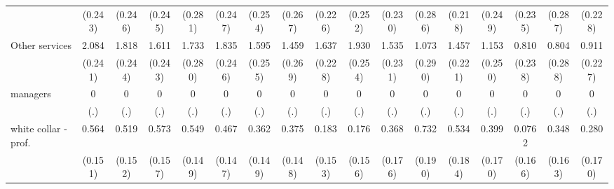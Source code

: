{\begin{tabular}{l*{16}{c}}
                    &     (0.243)         &     (0.246)         &     (0.245)         &     (0.281)         &     (0.247)         &     (0.254)         &     (0.267)         &     (0.226)         &     (0.252)         &     (0.230)         &     (0.286)         &     (0.218)         &     (0.249)         &     (0.235)         &     (0.287)         &     (0.228)         \\
[1em]
Other services      &       2.084\sym{***}&       1.818\sym{***}&       1.611\sym{***}&       1.733\sym{***}&       1.835\sym{***}&       1.595\sym{***}&       1.459\sym{***}&       1.637\sym{***}&       1.930\sym{***}&       1.535\sym{***}&       1.073\sym{***}&       1.457\sym{***}&       1.153\sym{***}&       0.810\sym{***}&       0.804\sym{**} &       0.911\sym{***}\\
                    &     (0.241)         &     (0.244)         &     (0.243)         &     (0.280)         &     (0.246)         &     (0.255)         &     (0.269)         &     (0.228)         &     (0.254)         &     (0.231)         &     (0.290)         &     (0.221)         &     (0.250)         &     (0.238)         &     (0.288)         &     (0.227)         \\
[1em]
managers            &           0         &           0         &           0         &           0         &           0         &           0         &           0         &           0         &           0         &           0         &           0         &           0         &           0         &           0         &           0         &           0         \\
                    &         (.)         &         (.)         &         (.)         &         (.)         &         (.)         &         (.)         &         (.)         &         (.)         &         (.)         &         (.)         &         (.)         &         (.)         &         (.)         &         (.)         &         (.)         &         (.)         \\
[1em]
white collar - prof.&       0.564\sym{***}&       0.519\sym{***}&       0.573\sym{***}&       0.549\sym{***}&       0.467\sym{**} &       0.362\sym{*}  &       0.375\sym{*}  &       0.183         &       0.176         &       0.368\sym{*}  &       0.732\sym{***}&       0.534\sym{**} &       0.399\sym{*}  &      0.0762         &       0.348\sym{*}  &       0.280         \\
                    &     (0.151)         &     (0.152)         &     (0.157)         &     (0.149)         &     (0.147)         &     (0.149)         &     (0.148)         &     (0.153)         &     (0.156)         &     (0.176)         &     (0.190)         &     (0.184)         &     (0.170)         &     (0.166)         &     (0.163)         &     (0.170)         \\

\end{tabular}}
